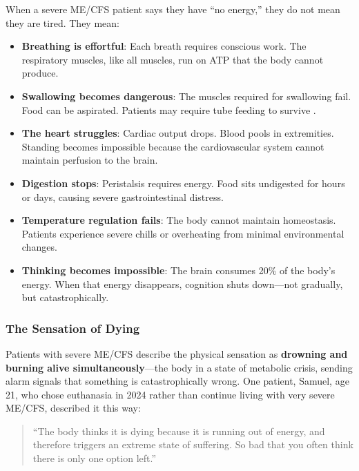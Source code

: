 When a severe ME/CFS patient says they have ``no energy,'' they do not mean they are tired. They mean:

\begin{itemize}
    \item \textbf{Breathing is effortful}: Each breath requires conscious work. The respiratory muscles, like all muscles, run on ATP that the body cannot produce.

    \item \textbf{Swallowing becomes dangerous}: The muscles required for swallowing fail. Food can be aspirated. Patients may require tube feeding to survive \cite{Baxter2021malnutrition}.

    \item \textbf{The heart struggles}: Cardiac output drops. Blood pools in extremities. Standing becomes impossible because the cardiovascular system cannot maintain perfusion to the brain.

    \item \textbf{Digestion stops}: Peristalsis requires energy. Food sits undigested for hours or days, causing severe gastrointestinal distress.

    \item \textbf{Temperature regulation fails}: The body cannot maintain homeostasis. Patients experience severe chills or overheating from minimal environmental changes.

    \item \textbf{Thinking becomes impossible}: The brain consumes 20\% of the body's energy. When that energy disappears, cognition shuts down---not gradually, but catastrophically.
\end{itemize}

\subsubsection{The Sensation of Dying}
\label{subsec:sensation-dying}

Patients with severe ME/CFS describe the physical sensation as \textbf{drowning and burning alive simultaneously}---the body in a state of metabolic crisis, sending alarm signals that something is catastrophically wrong. One patient, Samuel, age 21, who chose euthanasia in 2024 rather than continue living with very severe ME/CFS, described it this way:

\begin{quote}
``The body thinks it is dying because it is running out of energy, and therefore triggers an extreme state of suffering. So bad that you often think there is only one option left.''
\end{quote}

